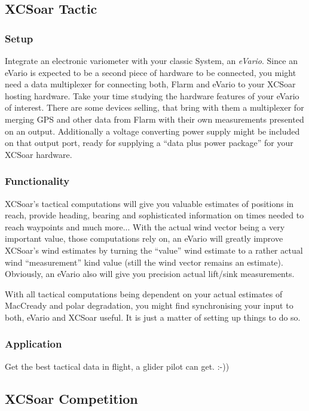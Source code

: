 \subsection*{XCSoar Tactic}
\subsubsection*{Setup} Integrate an electronic variometer with your classic 
System, an \emph{eVario}. Since an eVario is expected to be a second piece of 
hardware to be connected, you might need a data multiplexer for connecting both, 
Flarm and eVario to your XCSoar hosting hardware. Take your time studying the 
hardware features of your eVario of interest. There are some devices selling, 
that bring with them a multiplexer for merging GPS and other data from Flarm with 
their own measurements presented on an output. Additionally a voltage converting 
power supply might be included on that output port, ready for supplying a ``data
plus power package'' for your XCSoar hardware.

\subsubsection*{Functionality} XCSoar's tactical computations will give you 
valuable estimates of positions in reach, provide heading, bearing and 
sophisticated information on times needed to reach waypoints and much more... 
With the actual wind vector being a very important value, those computations rely 
on, an eVario will greatly improve XCSoar's wind estimates by turning the ``value''
wind estimate to a rather actual wind ``measurement'' kind value (still the wind 
vector remains an estimate). Obviously, an eVario also will give you precision 
actual lift/sink measurements.

With all tactical computations being dependent on your actual estimates of 
MacCready and polar degradation, you might find synchronising your input to both, 
eVario and XCSoar useful. It is just a matter of setting up things to do so.

\subsubsection*{Application} Get the best tactical data in flight, a glider pilot 
can get. :-))

\subsection*{XCSoar Competition}
